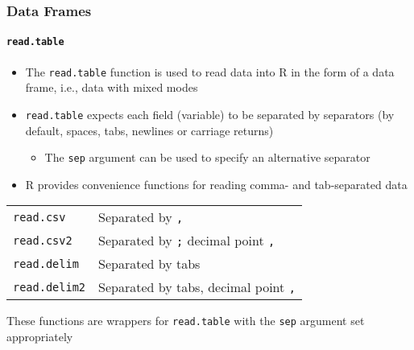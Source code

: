 \documentclass[paper=screen,mathserif]{beamer}\usepackage[]{graphicx}\usepackage[]{color}
\newcommand{\ft}[1]{\frametitle{#1}}
\newcommand{\fst}[1]{\framesubtitle{#1}}
\begin{document}
\begin{frame}[fragile]
  \ft{Data Frames}
  \fst{{\tt read.table}}
  \begin{itemize}
  \item The {\tt read.table} function is used to read data into R in
    the form of a data frame, i.e., data with mixed modes
  \item {\tt read.table} expects each field (variable) to be
    separated by separators (by default,  spaces, tabs, newlines or
    carriage returns)
    \begin{itemize}
    \item The {\tt sep} argument can be used to specify an
      alternative separator
    \end{itemize}
  \item R provides convenience functions for reading comma- and
    tab-separated data 
  \end{itemize}
  \begin{center}
    \begin{tabular}{p{4cm}p{6cm}}
      {\tt read.csv}   & Separated by {\tt ,} \\
      {\tt read.csv2}  & Separated by {\tt ;} decimal point {\tt ,} \\
      {\tt read.delim} & Separated by tabs    \\
      {\tt read.delim2} & Separated by tabs, decimal point {\tt ,}    \\
    \end{tabular}
  \end{center}
  {\small These functions are wrappers for {\tt read.table} with the
    {\tt sep} argument set appropriately}
\end{frame}
\end{document}
